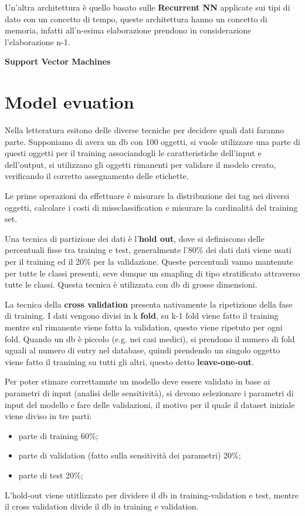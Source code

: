 \documentclass[12pt]{article}
\begin{document}
Un'altra architettura \`e quello basato sulle \textbf{Recurrent NN} applicate sui tipi di dato con un concetto di tempo, queste architettura hanno un concetto di memoria, infatti all'n-esima elaborazione prendono in considerazione l'elaborazione n-1.

\textbf{Support Vector Machines}



\newpage
\section{Model evuation}
Nella letteratura esitono delle diverse tecniche per decidere quali dati faranno parte. Supponiamo di avera un db con 100 oggetti, si vuole utilizzare una parte di questi oggetti per il training associandogli le caratteristiche dell'input e dell'output, si utilizzano gli oggetti rimanenti per validare il modelo creato, verificando il corretto assegnamento delle etichette. 

Le prime operazioni da effettuare \`e misurare la distribuzione dei tag nei diversi oggetti, calcolare i costi di missclassification e misurare la cardinalit\`a del training set.

Una tecnica di partizione dei dati \`e l'\textbf{hold out}, dove si definiscono delle percentuali fisse tra training e test, generalmente l'80\% dei dati dati viene usati per il training ed il 20\% per la validazione. Queste percentuali vanno mantenute per tutte le classi presenti, seve dunque un smapling di tipo stratificato attraverso tutte le classi. Questa tecnica \`e utilizzata con db di grosse dimensioni.

La tecnica della \textbf{cross validation} presenta nativamente la ripetizione della fase di training. I dati vengono divisi in k \textbf{fold}, su k-1 fold viene fatto il training mentre sul rimanente viene fatta la validation, questo viene ripetuto per ogni fold. Quando un db \`e piccolo (e.g. nei casi medici), si prendono il numero di fold uguali al numero di entry nel database, quindi prendendo un singolo oggetto viene fatto il tranining su tutti gli altri, questo detto \textbf{leave-one-out}.

Per poter stimare correttamnte un modello deve essere validato in base ai parametri di input (analisi delle sensitivit\`a), si devono selezionare i parametri di input del modello e fare delle validazioni, il motivo per il quale il dataset iniziale viene diviso in tre parti:
\begin{itemize}
    \item parte di training 60\%;
    \item parte di validation (fatto sulla sensitivit\`a dei parametri) 20\%;
    \item parte di test 20\%;
\end{itemize}
L'hold-out viene utitlizzato per dividere il db in training-validation e test, mentre il cross validation divide il db in training e validation.
\end{document}
